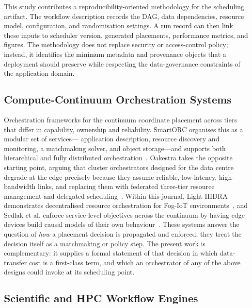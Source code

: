 This study contributes a reproducibility-oriented methodology for the scheduling artifact. The workflow description records the DAG, data dependencies, resource model, configuration, and randomisation settings. A run record can then link these inputs to scheduler version, generated placements, performance metrics, and figures. The methodology does not replace security or access-control policy; instead, it identifies the minimum metadata and provenance objects that a deployment should preserve while respecting the data-governance constraints of the application domain.

\subsection{Compute-Continuum Orchestration Systems}
\label{subsec:rw_orchestration}

Orchestration frameworks for the continuum coordinate placement across tiers that differ in
capability, ownership and reliability. SmartORC organises this as a modular set of services---%
application description, resource discovery and monitoring, a matchmaking solver, and object
storage---and supports both hierarchical and fully distributed orchestration~\cite{carlini2023smartorc}.
Oakestra takes the opposite starting point, arguing that cluster orchestrators designed for the
data centre degrade at the edge precisely because they assume reliable, low-latency,
high-bandwidth links, and replacing them with federated three-tier resource management and
delegated scheduling~\cite{bartolomeo2023oakestra}. Within this journal, Light-HIDRA demonstrates
decentralised resource orchestration for Fog-IoT environments~\cite{nunezgomez2024lighthidra}, and
Sedlak et al. enforce service-level objectives across the continuum by having edge devices build
causal models of their own behaviour~\cite{sedlak2024equilibrium}. These systems answer the
question of \emph{how} a placement decision is propagated and enforced; they treat the decision
itself as a matchmaking or policy step. The present work is complementary: it supplies a formal
statement of that decision in which data-transfer cost is a first-class term, and which an
orchestrator of any of the above designs could invoke at its scheduling point.

\subsection{Scientific and HPC Workflow Engines}
\label{subsec:rw_wms}

